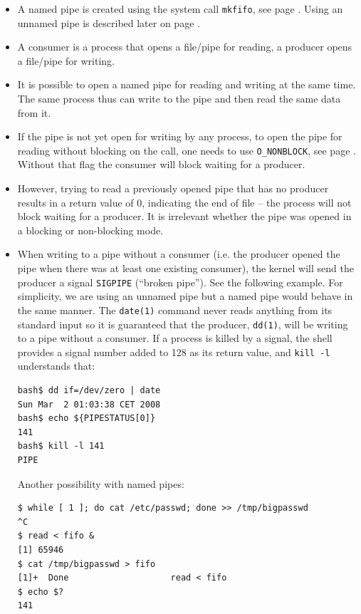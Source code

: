 \label{NAMEDPIPE}

\begin{itemize}
\item A named pipe is created using the system call \texttt{mkfifo}, see page
\pageref{MKFIFO}.  Using an unnamed pipe is described later on page
\pageref{PIPE}.
\item A consumer is a process that opens a file/pipe for reading, a producer
opens a file/pipe for writing. 
\item It is possible to open a named pipe for reading and writing at the same
time.  The same process thus can write to the pipe and then read the same data
from it.
\item If the pipe is not yet open for writing by any process, to open the pipe
for reading without blocking on the call, one needs to use \texttt{O\_NONBLOCK},
see page \pageref{O_NONBLOCK}.  Without that flag the consumer will block
waiting for a producer.
\item However, trying to read a previously opened pipe that has no producer
results in a return value of 0, indicating the end of file -- the process will
not block waiting for a producer.  It is irrelevant whether the pipe was opened
in a blocking or non-blocking mode.
\item When writing to a pipe without a consumer (i.e. the producer opened the
pipe when there was at least one existing consumer), the kernel will send the
producer a signal \texttt{SIGPIPE} (``broken pipe'').  See the following
example.  For simplicity, we are using an unnamed pipe but a named pipe
would behave in the same manner.  The \texttt{date(1)} command never
reads anything from its standard input so it is guaranteed that the producer,
\texttt{dd(1)}, will be writing to a pipe without a consumer.  If a process is
killed by a signal, the shell provides a signal number added to 128 as its
return value, and \texttt{kill -l} understands that:

\begin{verbatim}
bash$ dd if=/dev/zero | date
Sun Mar  2 01:03:38 CET 2008
bash$ echo ${PIPESTATUS[0]}
141
bash$ kill -l 141
PIPE
\end{verbatim}

Another possibility with named pipes:

\begin{verbatim}
$ while [ 1 ]; do cat /etc/passwd; done >> /tmp/bigpasswd
^C
$ read < fifo &
[1] 65946
$ cat /tmp/bigpasswd > fifo
[1]+  Done                    read < fifo
$ echo $?
141
\end{verbatim}


\end{itemize}

